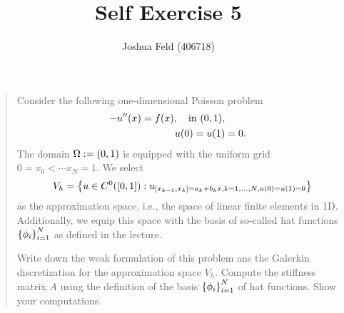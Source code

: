 \documentclass[english]{exercise}
\title{Self Exercise 5}
\author{Joshua Feld (406718)}
\begin{document}
	\maketitle


	\section{}

	\begin{quote}
		Consider the following one-dimensional Poisson problem
		\begin{align*}
			-u''\parentheses*{x} = f\parentheses*{x}, \quad \text{in }\parentheses*{0, 1},\\
			u\parentheses*{0} = u\parentheses*{1} &= 0.
		\end{align*}
		The domain \(\Omega := \parentheses*{0, 1}\) is equipped with the uniform grid \(0 = x_0 < \cdots x_N = 1.\)
		We select
		\[
			V_h = \braces*{u \in C^0\parentheses*{\brackets*{0, 1}} : u_{\brackets*{x_{k - 1}, x_k} = a_k + b_k x, k = 1, \ldots, N, u\parentheses*{0} = u\parentheses*{1} = 0}}
		\]
		as the approximation space, i.e., the space of linear finite elements in 1D.
		Additionally, we equip this space with the basis of so-called hat functions \(\braces*{\phi_i}_{i = 1}^N\) as defined in the lecture.

		Write down the weak formulation of this problem ans the Galerkin discretization for the approximation space \(V_h\).
		Compute the stiffness matrix \(A\) using the definition of the basis \(\braces*{\phi_i}_{i = 1}^N\) of hat functions.
		Show your computations.
	\end{quote}


	\section{}
\end{document}

